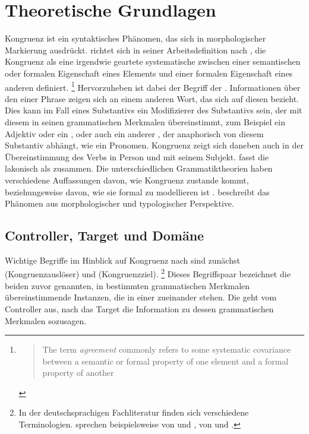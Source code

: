 \chapter{Theoretische Grundlagen}
\label{ch:theorie}

Kongruenz ist ein syntaktisches Phänomen, das sich in morphologischer
Markierung ausdrückt. \citet{corbett2006} richtet sich in seiner
Arbeitsdefinition nach \citet[610]{steele1978}, die Kongruenz als eine
irgendwie geartete systematische  zwischen einer semantischen
oder formalen Eigenschaft eines Elements und einer formalen Eigenschaft eines
anderen definiert.%
%
	\footnote{\blockcquote[610]{steele1978}{The term \emph{agreement} commonly
		refers to some systematic covariance between a semantic or formal
		property of one element and a formal property of another}.%
	}
%
Hervorzuheben ist dabei der Begriff der . Informationen über den
 einer Phrase zeigen sich an einem anderen Wort, das sich auf diesen
 bezieht. Dies kann im Fall eines Substantivs ein Modifizierer des
Substantivs sein, der mit diesem in seinen grammatischen
Merkmalen übereinstimmt, zum Beispiel ein
Adjektiv oder ein , oder auch ein anderer
, der anaphorisch von diesem Substantiv abhängt, wie ein
Pronomen. Kongruenz zeigt sich daneben auch in der Übereinstimmung des Verbs in
Person und  mit seinem Subjekt. \citet[20]{corbett2006} fasst die
 lakonisch als  zusammen. Die unterschiedlichen Grammatiktheorien
haben verschiedene Auffassungen davon, wie Kongruenz zustande kommt,
beziehungsweise davon, wie sie formal zu modellieren ist
\autocite[siehe~z.\,B.][]{mueller2023}. \citeauthor{corbett2006} beschreibt das
Phänomen aus morphologischer und typologischer Perspektive.

\section{Controller, Target und Domäne}
\label{sec:ctrltarg}


Wichtige Begriffe im Hinblick auf Kongruenz nach \citet{corbett2006} sind
zunächst  (Kongruenzauslöser) und  (Kongruenzziel).%
%
	\footnote{In der deutschsprachigen Fachliteratur finden sich verschiedene
	Terminologien. \citet{fleischerschallert2011} sprechen beispielsweise von
	 und , \citet{panther2009} von
	 und .}
%
Dieses Begriffspaar bezeichnet die beiden zuvor genannten, in bestimmten
grammatischen Merkmalen übereinstimmende Instanzen,
die in einer  zueinander stehen. Die
 geht vom Controller aus, nach \citeauthor{corbett2006}
 das Target die Information zu dessen grammatischen
Merkmalen sozusagen.

